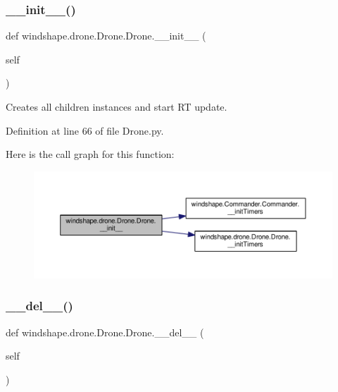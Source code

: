 \subsubsection{\texorpdfstring{\+\_\+\+\_\+init\+\_\+\+\_\+()}{\_\_init\_\_()}}
{\footnotesize\ttfamily def windshape.\+drone.\+Drone.\+Drone.\+\_\+\+\_\+init\+\_\+\+\_\+ (\begin{DoxyParamCaption}\item[{}]{self }\end{DoxyParamCaption})}

\begin{DoxyVerb}Creates all children instances and start RT update.\end{DoxyVerb}
 

Definition at line 66 of file Drone.\+py.

Here is the call graph for this function\+:\nopagebreak
\begin{figure}[H]
\begin{center}
\leavevmode
\includegraphics[width=350pt]{classwindshape_1_1drone_1_1_drone_1_1_drone_ae2c508fe84e2be14bbf31812711cdfd6_cgraph}
\end{center}
\end{figure}
\mbox{\label{classwindshape_1_1drone_1_1_drone_1_1_drone_a1ab69c6c179d0dcab1694c42f023cb37}} 
\subsubsection{\texorpdfstring{\+\_\+\+\_\+del\+\_\+\+\_\+()}{\_\_del\_\_()}}
{\footnotesize\ttfamily def windshape.\+drone.\+Drone.\+Drone.\+\_\+\+\_\+del\+\_\+\+\_\+ (\begin{DoxyParamCaption}\item[{}]{self }\end{DoxyParamCaption})}

